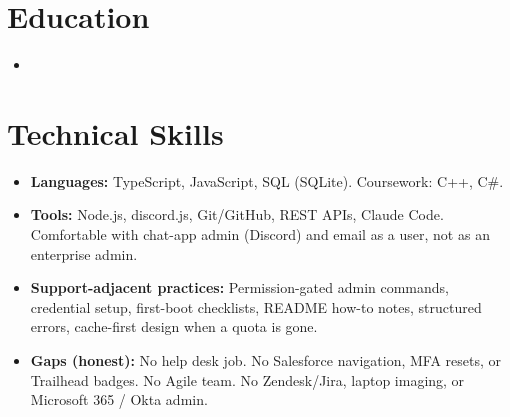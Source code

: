 \documentclass[11pt,a4paper,sans]{moderncv}
\begin{document}
\clearpage

\section{Education}
\vspace{1pt}
\begin{itemize}

\item{}

\end{itemize}


\section{Technical Skills}
\vspace{1pt}
\begin{itemize}
\item \textbf{Languages:} TypeScript, JavaScript, SQL (SQLite). Coursework: C++, C\#.
\item \textbf{Tools:} Node.js, discord.js, Git/GitHub, REST APIs, Claude Code. Comfortable with chat-app admin (Discord) and email as a user, not as an enterprise admin.
\item \textbf{Support-adjacent practices:} Permission-gated admin commands, credential setup, first-boot checklists, README how-to notes, structured errors, cache-first design when a quota is gone.
\item \textbf{Gaps (honest):} No help desk job. No Salesforce navigation, MFA resets, or Trailhead badges. No Agile team. No Zendesk/Jira, laptop imaging, or Microsoft 365 / Okta admin.
\end{itemize}

\end{document}
